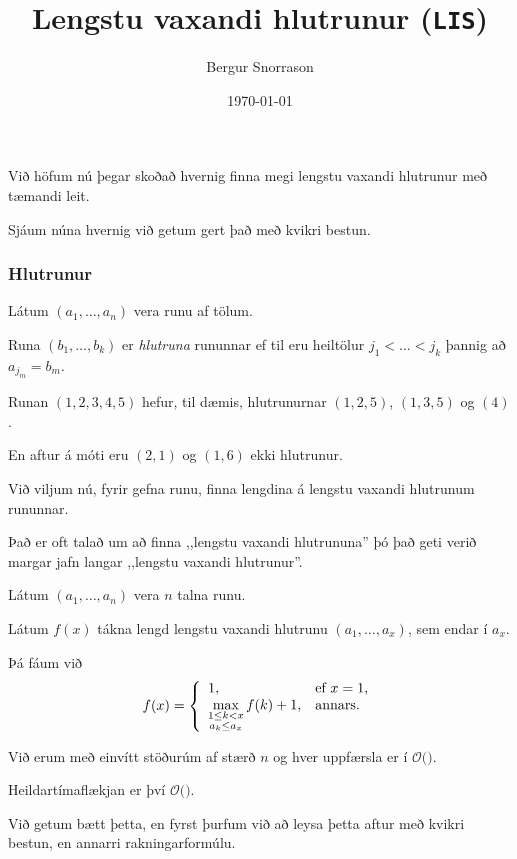 \title{Lengstu vaxandi hlutrunur (\texttt{LIS})}
\author{Bergur Snorrason}
\date{\today}



\frame{\titlepage}

{
	{
		\item<1-> Við höfum nú þegar skoðað hvernig finna megi lengstu vaxandi hlutrunur með tæmandi leit.
		\item<2-> Sjáum núna hvernig við getum gert það með kvikri bestun.
	}
}

{
	\frametitle{Hlutrunur}
	{
		\item<1-> Látum $(a_1, \dots, a_n)$ vera runu af tölum.
		\item<2-> Runa $(b_1, \dots, b_k)$ er \emph{hlutruna} rununnar ef til eru heiltölur $j_1 < \dots < j_k$ þannig að $a_{j_m} = b_m$.
		\item<3-> Runan $(1, 2, 3, 4, 5)$ hefur, til dæmis, hlutrunurnar $(1, 2, 5)$, $(1, 3, 5)$ og $(4)$.
		\item<4-> En aftur á móti eru $(2, 1)$ og $(1, 6)$ ekki hlutrunur.
		\item<5-> Við viljum nú, fyrir gefna runu, finna lengdina á lengstu vaxandi hlutrunum rununnar.
		\item<6-> Það er oft talað um að finna ,,lengstu vaxandi hlutrununa'' þó það geti verið margar jafn langar ,,lengstu vaxandi hlutrunur''.
	}
}

{
	{
		\item<1-> Látum $(a_1, \dots, a_n)$ vera $n$ talna runu.
		\item<2-> Látum $f(x)$ tákna lengd lengstu vaxandi hlutrunu $(a_1, \dots, a_x)$, sem endar í $a_x$.
		\item<3-> Þá fáum við
		\[
			f(x) = \left \{
			\env{array}
			{ {l l}
				1, & \text{ef $x = 1$,} \\
				\displaystyle \max_{\substack{1 \leq k < x\\a_k \leq a_x}} f(k) + 1, & \text{annars.}
			}
			\right .
		\]
	}
}

{
}

{
	{
		\item<1-> Við erum með einvítt stöðurúm af stærð $n$ og hver uppfærsla er í $\mathcal{O}($\onslide<2->{$\,n\,$}$)$.
		\item<3-> Heildartímaflækjan er því $\mathcal{O}($\onslide<4->{$n^2$}$)$.
		\item<5-> Við getum bætt þetta, en fyrst þurfum við að leysa þetta aftur með kvikri bestun, en annarri rakningarformúlu.
	}
}


